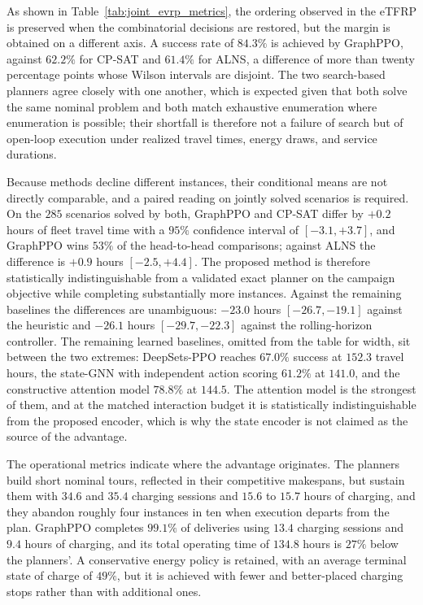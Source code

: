 \documentclass[a4paper,fleqn]{cas-sc}
\begin{document}
As shown in Table~\ref{tab:joint_evrp_metrics}, the ordering observed in the eTFRP is preserved when the combinatorial decisions are restored, but the margin is obtained on a different axis. A success rate of $84.3\%$ is achieved by GraphPPO, against $62.2\%$ for CP-SAT and $61.4\%$ for ALNS, a difference of more than twenty percentage points whose Wilson intervals are disjoint. The two search-based planners agree closely with one another, which is expected given that both solve the same nominal problem and both match exhaustive enumeration where enumeration is possible; their shortfall is therefore not a failure of search but of open-loop execution under realized travel times, energy draws, and service durations.

Because methods decline different instances, their conditional means are not directly comparable, and a paired reading on jointly solved scenarios is required. On the $285$ scenarios solved by both, GraphPPO and CP-SAT differ by $+0.2$ hours of fleet travel time with a $95\%$ confidence interval of $[-3.1, +3.7]$, and GraphPPO wins $53\%$ of the head-to-head comparisons; against ALNS the difference is $+0.9$ hours $[-2.5, +4.4]$. The proposed method is therefore statistically indistinguishable from a validated exact planner on the campaign objective while completing substantially more instances. Against the remaining baselines the differences are unambiguous: $-23.0$ hours $[-26.7, -19.1]$ against the heuristic and $-26.1$ hours $[-29.7, -22.3]$ against the rolling-horizon controller. The remaining learned baselines, omitted from the table for width, sit between the two extremes: DeepSets-PPO reaches $67.0\%$ success at $152.3$ travel hours, the state-GNN with independent action scoring $61.2\%$ at $141.0$, and the constructive attention model $78.8\%$ at $144.5$. The attention model is the strongest of them, and at the matched interaction budget it is statistically indistinguishable from the proposed encoder, which is why the state encoder is not claimed as the source of the advantage.

The operational metrics indicate where the advantage originates. The planners build short nominal tours, reflected in their competitive makespans, but sustain them with $34.6$ and $35.4$ charging sessions and $15.6$ to $15.7$ hours of charging, and they abandon roughly four instances in ten when execution departs from the plan. GraphPPO completes $99.1\%$ of deliveries using $13.4$ charging sessions and $9.4$ hours of charging, and its total operating time of $134.8$ hours is $27\%$ below the planners'. A conservative energy policy is retained, with an average terminal state of charge of $49\%$, but it is achieved with fewer and better-placed charging stops rather than with additional ones.
\end{document}
